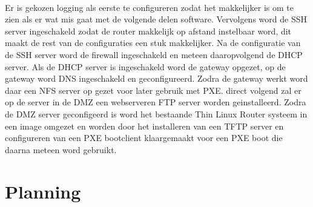 \documentclass[12pt]{article}
\begin{document}
\paragraph{}
Er is gekozen logging als eerste te configureren zodat het makkelijker is om te zien als er wat mis gaat met de volgende delen software. Vervolgens word de SSH server ingeschakeld zodat de router makkelijk op afstand instelbaar word, dit maakt de rest van de configuraties een stuk makkelijker. Na de configuratie van de SSH server word de firewall ingeschakeld en meteen daaropvolgend de DHCP server. Als de DHCP server is ingeschakeld word de gateway opgezet, op de gateway word DNS ingeschakeld en geconfigureerd. Zodra de gateway werkt word daar een NFS server op gezet voor later gebruik met PXE. direct volgend zal er op de server in de DMZ een webserveren FTP server worden geinstalleerd. Zodra de DMZ server geconfigeerd is word het bestaande Thin Linux Router systeem in een image omgezet en worden door het installeren van een TFTP server en configureren van een PXE bootclient klaargemaakt voor een PXE boot die daarna meteen word gebruikt.
\section{Planning}

\end{document}
